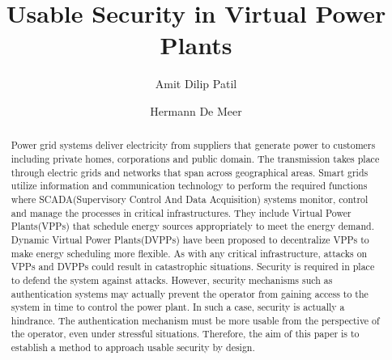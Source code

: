 \documentclass[sigconf]{acmart}
\begin{document}
\title{Usable Security in Virtual Power Plants}


\author{Amit Dilip Patil}

\author{Hermann De Meer}



\renewcommand{\shortauthors}{Patil et al.}


\begin{abstract}
Power grid systems deliver electricity from suppliers that generate power to customers
including private homes, corporations and public domain. The transmission takes place
through electric grids and networks that span across geographical areas. Smart grids utilize information and communication technology to perform the required functions where
SCADA(Supervisory Control And Data Acquisition) systems monitor, control and manage
the processes in critical infrastructures. They include Virtual Power Plants(VPPs) that
schedule energy sources appropriately to meet the energy demand. Dynamic Virtual Power
Plants(DVPPs) have been proposed to decentralize VPPs to make energy scheduling more
flexible. As with any critical infrastructure, attacks on VPPs and DVPPs could result in
catastrophic situations. Security is required in place to defend the system against attacks. However, security mechanisms such as authentication systems may actually prevent the operator from gaining access to the system in time to control the power plant. In such a case, security is actually a hindrance. The authentication mechanism must be more usable from the perspective of the operator, even under stressful situations. Therefore, the aim of this paper is to establish a method to approach usable security by design.
\end{abstract}
\end{document}
